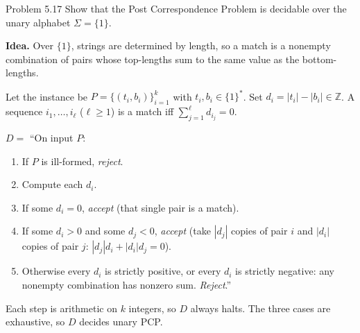 \begin{question}{Problem 5.17}
Show that the Post Correspondence Problem is decidable over the unary alphabet $\Sigma=\{1\}$.
\end{question}
\begin{soln}
\textbf{Idea.} Over $\{1\}$, strings are determined by length, so a match is a nonempty combination of pairs whose top-lengths sum to the same value as the bottom-lengths.

Let the instance be $P=\{(t_i,b_i)\}_{i=1}^k$ with $t_i,b_i\in\{1\}^*$. Set $d_i=|t_i|-|b_i|\in\mathbb{Z}$. A sequence $i_1,\dots,i_\ell$ ($\ell\ge 1$) is a match iff $\sum_{j=1}^\ell d_{i_j}=0$.

$D=$ ``On input $P$:
\begin{enumerate}
\item If $P$ is ill-formed, \emph{reject}.
\item Compute each $d_i$.
\item If some $d_i=0$, \emph{accept} (that single pair is a match).
\item If some $d_i>0$ and some $d_j<0$, \emph{accept}
(take $|d_j|$ copies of pair $i$ and $|d_i|$ copies of pair $j$:
$|d_j|d_i+|d_i|d_j=0$).
\item Otherwise every $d_i$ is strictly positive, or every $d_i$ is strictly negative: any nonempty combination has nonzero sum. \emph{Reject}.''
\end{enumerate}
Each step is arithmetic on $k$ integers, so $D$ always halts. The three cases are exhaustive, so $D$ decides unary PCP.
\end{soln}

